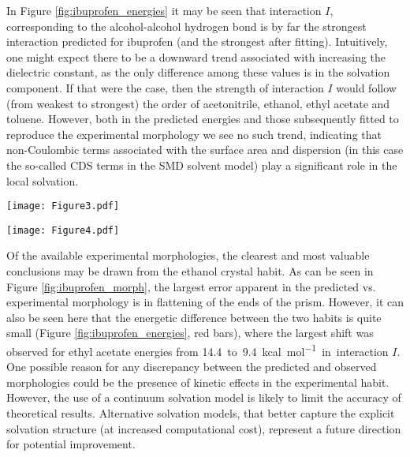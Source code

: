 \documentclass[twoside,twocolumn,9pt]{article}
\begin{document}
In Figure \ref{fig:ibuprofen_energies} it may be seen that interaction $\textit{I}$, corresponding to the alcohol-alcohol hydrogen bond is by far the strongest interaction predicted for ibuprofen (and the strongest after fitting). Intuitively, one might expect there to be a downward trend associated with increasing the dielectric constant, as the only difference among these values is in the solvation component.
If that were the case, then the strength of interaction $\textit{I}$ would follow (from weakest to strongest) the order of acetonitrile, ethanol, ethyl acetate and toluene. However, both in the predicted energies and those subsequently fitted to reproduce the experimental morphology we see no such trend, indicating that non-Coulombic terms associated with the surface area and dispersion (in this case the so-called CDS terms in the SMD solvent model) play a significant role in the local solvation.

\begin{figure*}
\centering
  \texttt{[image: Figure3.pdf]}
  \caption{Comparison of the energies for different interaction directions as a function of solvent. Coloured bars represent the theoretically predicted value, while black lines indicate the change in each value as a result of experimental fitting.}
  \label{fig:ibuprofen_energies}
\end{figure*}

\begin{figure*}
\centering
  \texttt{[image: Figure4.pdf]}
  \caption{Comparison of predicted crystal morphologies (top) 
  with those after fitting energies to the experimental shape (bottom) for ibuprofen crystals grown in (left to right) ethanol, ethyl acetate, toluene and acetonitrile. Simulated crystal growth images are coloured by growth layer.}
  \label{fig:ibuprofen_morph}
\end{figure*}

Of the available experimental morphologies, the clearest and most valuable conclusions may be drawn from the ethanol crystal habit. As can be seen in Figure \ref{fig:ibuprofen_morph}, the largest error apparent in the predicted vs. experimental morphology is in flattening of the ends of the prism. However, it can also be seen here that the energetic difference between the two habits is quite small (Figure \ref{fig:ibuprofen_energies}, red bars), where the largest shift was observed for ethyl acetate energies from \qty{14.4} to \qty{9.4}{kcal.mol^{-1}} in interaction $\textit{I}$. One possible reason for any discrepancy between the predicted and observed morphologies could be the presence of kinetic effects in the experimental habit. However, the use of a continuum solvation model is likely to limit the accuracy of theoretical results. Alternative solvation models, that better capture the explicit solvation structure (at increased computational cost), 
represent a future direction for potential improvement.
\end{document}
